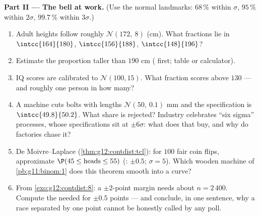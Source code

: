 \begin{problem}
\medskip
\noindent\textbf{Part II --- The bell at work.}
(Use the normal landmarks: $68\,\%$ within $\sigma$, $95\,\%$
within $2\sigma$, $99.7\,\%$ within $3\sigma$.)
\begin{enumerate}[resume]
  \item Adult heights follow roughly
        $\mathcal N(172,\ 8)$ (cm). What fractions lie in
        $\intcc{164}{180}$, $\intcc{156}{188}$,
        $\intcc{148}{196}$?
  \item Estimate the proportion taller than $190$ cm (
        first; table or calculator).
  \item IQ scores are calibrated to $\mathcal N(100, 15)$.
        What fraction scores above $130$ --- and roughly one
        person in how many?
  \item A machine cuts bolts with lengths
        $\mathcal N(50,\ 0.1)$ mm and the specification is
        $\intcc{49.8}{50.2}$. What share is rejected? Industry
        celebrates ``six sigma'' processes, whose
        specifications sit at $\pm 6\sigma$: what does that
        buy, and why do factories chase it?
  \item De Moivre--Laplace (\cref{thm:g12:contdist:tcl}): for
        $100$ fair coin flips, approximate
        $\P(45 \leq \text{heads} \leq 55)$ (:
        $\pm 0.5$; $\sigma = 5$). Which wooden machine of
        \cref{pb:g11:binom:1} does this theorem smooth into a
        curve?
  \item From \cref{exo:g12:contdist:8}: a $\pm 2$-point margin
        needs about $n = 2\,400$. Compute the  needed for
        $\pm 0.5$ points --- and conclude, in one sentence, why
        a race separated by one point cannot be honestly called
        by any poll.
\end{enumerate}


\end{problem}
